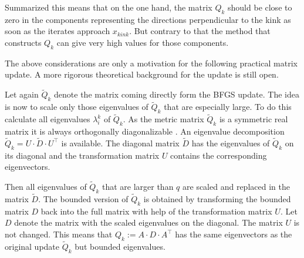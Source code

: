 Summarized this means that on the one hand, the matrix \(Q_k\) should be close to zero in the components representing the directions perpendicular to the kink as soon as the iterates approach \(x_{{kink}}\). But contrary to that the method that constructs \(Q_k\) can give very high values for those components.

\begin{remark}
	The above considerations are only a motivation for the following practical matrix update. A more rigorous theoretical background for the update is still open.
\end{remark}

Let again \(\tilde{Q}_k\) denote the matrix coming directly form the BFGS update.
The idea is now to scale only those eigenvalues of \(\tilde{Q}_k\) that are especially large.
To do this calculate all eigenvalues \(\lambda^k_i\) of \(\tilde{Q}_k\).
As the metric matrix \(\tilde{Q}_k\) is a symmetric real matrix it is  always orthogonally diagonalizable \cite[Corollary 18.18 p. 282]{Liesen2015}. An eigenvalue decomposition \(\tilde{Q}_k = U\cdot \tilde{D} \cdot U^{\top}\) is available. The diagonal matrix \(\tilde{D}\) has the eigenvalues of \(\tilde{Q}_k\) on its diagonal and the transformation matrix \(U\) contains the corresponding eigenvectors.



Then all eigenvalues of \(\tilde{Q}_k\) that are larger than \(q\) are scaled and replaced in the matrix \(\tilde{D}\). The bounded version of \(\tilde{Q}_k\) is obtained by transforming the bounded matrix \(D\) back into the full matrix with help of the transformation matrix \(U\).
Let \(D\) denote the matrix with the scaled eigenvalues on the diagonal. The matrix \(U\) is not changed. This means that \({Q}_k := A\cdot{D}\cdot A^{\top}\) has the same eigenvectors as the original update \(\tilde{Q}_k\) but bounded eigenvalues.



